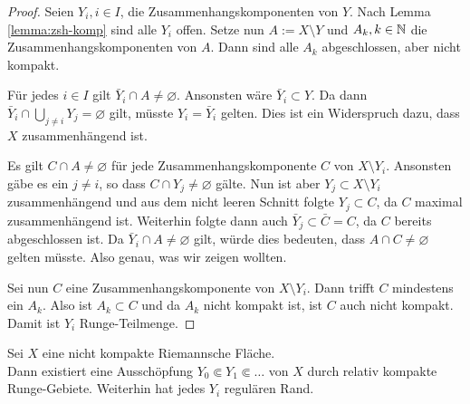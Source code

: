 \begin{proof}
  Seien $Y_i, i \in I$, die Zusammenhangskomponenten von
  $Y$. Nach Lemma \ref{lemma:zsh-komp} sind alle $Y_i$ offen.
  Setze nun $A := X \setminus Y$ und $A_k, k\in \mathbb{N}$ die
  Zusammenhangskomponenten von $A$. Dann sind alle $A_k$
  abgeschlossen, aber nicht kompakt.
  
  Für jedes $i \in I$ gilt $\bar Y_i \cap A \neq
  \varnothing$. 
  Ansonsten wäre $\bar Y_i \subset Y$. Da dann $\bar Y_i \cap \bigcup_{j
    \neq i} Y_j = \varnothing$ gilt, müsste $Y_i = \bar Y_i$ gelten. Dies
  ist ein Widerspruch dazu, dass $X$ zusammenhängend ist.
  
  Es gilt $C \cap A \neq \varnothing$ für jede
  Zusammenhangskomponente $C$ von $X \setminus Y_i$. 
  Ansonsten gäbe es ein $j \neq i$, so dass $C \cap Y_j \neq
  \varnothing$ gälte.
  Nun ist aber $Y_j \subset X \setminus Y_i$ zusammenhängend und aus
  dem nicht leeren Schnitt folgte $Y_j \subset C$, da $C$ maximal
  zusammenhängend ist. Weiterhin folgte dann auch $\bar Y_j \subset
  \bar C = C$, da $C$ bereits abgeschlossen ist. Da $\bar Y_i \cap A
  \neq \varnothing$ gilt,  würde dies
  bedeuten, dass $A \cap C \neq \varnothing$ gelten müsste. Also
  genau, was wir zeigen wollten.
  
  Sei nun $C$ eine Zusammenhangskomponente von $X \setminus
  Y_i$. Dann trifft $C$ mindestens ein $A_k$. Also ist $A_k
  \subset C$ und da $A_k$ nicht kompakt ist, ist $C$ auch nicht kompakt.
  Damit ist $Y_i$ Runge-Teilmenge.
\end{proof}

\begin{thm}
  \label{thm:Ausschöpfung-Runge}
  Sei $X$ eine nicht kompakte Riemannsche Fläche. \\
  Dann existiert eine Ausschöpfung $Y_0 \Subset Y_1 \Subset \dots$ von
  $X$ durch relativ kompakte Runge-Gebiete. Weiterhin hat jedes $Y_i$
  regulären Rand.
\end{thm}

